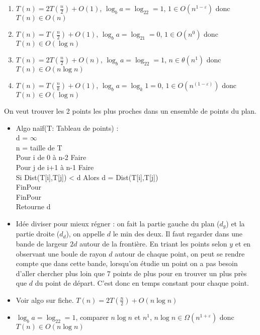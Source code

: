
\begin{enumerate}
	\item $T(n) = 2T(\frac{n}{2}) + O(1)$, $\log_ba=\log_22=1$, $1\in O(n^{1-\varepsilon})$ donc $T(n)\in O(n)$
	\item $T(n) = T(\frac{n}{2}) + O(1)$, $\log_ba=\log_21=0$, $1 \in O(n^0)$ donc $T(n)\in O(\log n)$
	\item $T(n) = 2T(\frac{n}{2}) + O(n)$, $\log_ba=\log_22=1$, $n \in \theta(n^1)$ donc $T(n) \in O(n\log n)$
	\item $T(n) = T(\frac{n}{k}) + O(1)$, $\log_ba=\log_k1=0$, $1 \in O(n^(1-\varepsilon))$ donc $T(n)\in O(\log n)$
\end{enumerate}

 On veut trouver les 2 points les plus proches dans un ensemble de points du plan. \\

\begin{itemize}
	\item Algo naïf(T: Tableau de points) :\\
d = $\infty$ \\
n = taille de T\\
Pour i de 0 à n-2 Faire \\
	\hspace*{1cm} Pour j de i+1 à n-1 Faire \\
		\hspace*{2cm} Si Dist(T[i],T[j]) < d Alors d = Dist(T[i],T[j])\\
	\hspace*{1cm} FinPour\\
FinPour\\
Retourne d\\
	\item Idée diviser pour mieux régner : on fait la partie gauche du plan ($d_g$) et la partie droite ($d_d$), on appelle $d$ le min des deux. Il faut regarder dans une bande de largeur $2d$ autour de la frontière. En triant les points selon $y$ et en observant une boule de rayon $d$ autour de chaque point, on peut se rendre compte que dans cette bande, lorsqu'on étudie un point on a pas besoin d'aller chercher plus loin que 7 points de plus pour en trouver un plus près que $d$ du point de départ. C'est donc en temps constant pour chaque point. 
	\item Voir algo sur fiche. $T(n) = 2T(\frac{n}{2}) + O(n\log n)$
	\item $\log_ba =\log_22 =1$, comparer $n\log n$ et $n^1$, $n\log n \in \Omega(n^{1+\varepsilon})$ donc $T(n)\in O(n\log n)$
\end{itemize}
